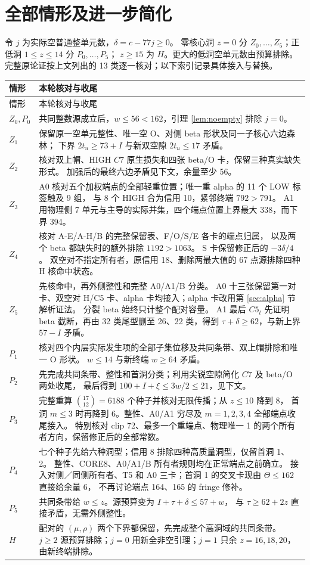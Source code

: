 \documentclass[11pt,a4paper]{article}
\begin{document}
\section{全部情形及进一步简化}\label{sec:cases}
令 $j$ 为实际空普通整单元数，$\delta=c-77j\ge0$。
零核心洞 $z=0$ 分 $Z_0,\ldots,Z_5$；正低洞 $1\le z\le14$ 分 $P_0,\ldots,P_5$；
$z\ge15$ 为 $H$。更大的低洞空单元数由预算排除。
完整原论证按上文列出的 13 类逐一核对；以下索引记录具体接入与替换。

\begin{longtable}{p{.08\linewidth}p{.85\linewidth}}
\toprule 情形&本轮核对与收尾\\\midrule\endfirsthead
\toprule 情形&本轮核对与收尾\\\midrule\endhead
$Z_0,P_0$&共同整数源成立后，$w\le56<162$，引理 \ref{lem:noempty} 排除 $j=0$。\\
$Z_1$&保留原一空单元整性、唯一空 O、对侧 beta 形状及同一子核心六边森林；
下界 $2t_u\ge73+I$ 与新双空隙 $2t_u\le17$ 矛盾。\\
$Z_2$&核对双上帽、HIGH $C7$ 原生损失和四张 beta/O 卡，保留三种真实缺失形式。
加强后的最终六边矛盾见下文，余量至少 56。\\
$Z_3$&A0 核对五个加权端点的全部轻重位置；唯一重 alpha 的 11 个 LOW 标签触及 9 组，
与 8 个 HIGH 合为信用 10，紧邻终端 $792>791$。
A1 用物理侧 7 单元与主导的实际并集，四个端点位置上界最大 338，而下界 394。\\
$Z_4$&核对 A-E/A-H/B 的完整保留表、F/O/S/E 各卡的端点归属，
以及两个 beta 都缺失时的额外排除 $1192>1063$。
S 卡保留修正后的 $-3\delta/4$。
双空对不指定所有者，原信用 18、删除两最大值的 67 点源排除四种 H 核命中状态。\\
$Z_5$&先核命中，再外侧整性和完整 A0/A1/B 分类。
A0 十三张保留第一对卡、双空对 H/C5 卡、alpha 卡均接入；alpha 卡改用第 \ref{sec:alpha} 节解析证法。
分裂 beta 始终只计整个配对容量。
A1 最后 $C5_t$ 先证明 beta 截断，再由 32 类尾型删至 26、22 类，得到
$\tau+\delta\ge62$，与新上界 $57-I$ 矛盾。\\
$P_1$&核对四个内层实际发生项的全部子集位移及共同条带、双上帽排除和唯一 O 形状。
$w\le14$ 与新终端 $w\ge64$ 矛盾。\\
$P_2$&先完成共同条带、整性和首洞分类；利用尖锐空隙简化 $C7$ 及 beta/O 两处收尾，
最后得到 $100+I+\xi\le3w/2\le21$，见下文。\\
$P_3$&完整重算 $\binom{17}{12}=6188$ 个种子并核对无限传播；从 $z\le10$ 降到 8，
首洞 $m\le3$ 时再降到 6。整性、A0/A1 穷尽及 $m=1,2,3,4$ 全部端点收尾接入。
特别核对 clip 72、最多一个重端点、物理唯一 1 的两个所有者方向，保留修正后的全部常数。\\
$P_4$&七个种子先给六种洞型；信用 8 排除四种高质量洞型，仅留首洞 1、2。
整性、CORE8、A0/A1/B 所有者规则均在正常端点之前确立。
接入对侧／同侧所有者、T5 和 A0 三卡；首洞 1 的交叉卡现由 $\Theta\le162$ 直接给余量 6，
不再讨论端点 164、165 的 fringe 修补。\\
$P_5$&共同条带给 $w\le z$。源预算变为 $I+\tau+\delta\le57+w$，
与 $\tau\ge62+2z$ 直接矛盾，无需外侧整性。\\
$H$&配对的 $(\mu,\rho)$ 两个下界都保留，先完成整个高洞域的共同条带。
$j\ge2$ 源预算排除；$j=0$ 用新全非空引理；$j=1$ 只余 $z=16,18,20$，由新终端排除。\\
\bottomrule
\end{longtable}
\end{document}
